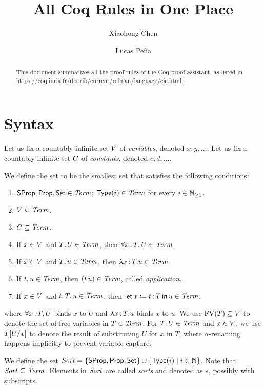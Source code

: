 \documentclass{article}
\title{All Coq Rules in One Place}
\author{Xiaohong Chen \and Lucas Pe{\~{n}}a}
\begin{document}
\maketitle

\begin{abstract}
This document summarizes all the proof rules of the Coq proof assistant,
as listed in 
\url{https://coq.inria.fr/distrib/current/refman/language/cic.html}.
\end{abstract}

\section{Syntax}

Let us fix a countably infinite set $V$ of \emph{variables}, denoted 
$x,y,\dots$. 
Let us fix a countably infinite set $C$ of \emph{constants}, denoted
$c,d,\dots$.

\begin{definition}
We define the set \CoqTerm to be the smallest set that satisfies the following 
conditions:
\begin{enumerate}
\item $\mathsf{SProp},\mathsf{Prop},\mathsf{Set} \in \textnormal{\textit{Term}}$; $\mathsf{Type}(i) \in \textnormal{\textit{Term}}$ for every $i 
\in {\mathbb{N}_{\ge 1}}$. 
\item $V \subseteq \textnormal{\textit{Term}}$.
\item $C \subseteq \textnormal{\textit{Term}}$.
\item If $x \in V$ and $T,U \in \textnormal{\textit{Term}}$, 
      then $\forall x {\,:\,} T , U \in \textnormal{\textit{Term}}$.
\item If $x \in V$ and $T,u \in \textnormal{\textit{Term}}$,
      then $\lambda x {\,:\,} T . u \in \textnormal{\textit{Term}}$.
\item If $t,u \in \textnormal{\textit{Term}}$,
      then $(t \, u) \in \textnormal{\textit{Term}}$, called \emph{application}.
\item If $x \in V$ and $t,T,u \in \textnormal{\textit{Term}}$,
      then $\textsf{let} \, x \coloneqq t {\,:\,} T \,\textsf{in}\, u \in \textnormal{\textit{Term}}$.
\end{enumerate}
where $\forall x {\,:\,} T , U$ binds $x$ to $U$
and $\lambda x {\,:\,} T . u$ binds $x$ to $u$.
We use $\mathrm{FV}(T) \subseteq V$ to denote the set of free variables in $T \in 
\textnormal{\textit{Term}}$. 
For $T,U \in \textnormal{\textit{Term}}$ and $x \in V$, 
we use $T [ U / x ]$ to denote the result of substituting $U$ for $x$ in $T$,
where $\alpha$-renaming happens implicitly to prevent variable capture.
\end{definition}

\begin{definition}
We define the set 
$\textnormal{\textit{Sort}} = \{\mathsf{SProp},\mathsf{Prop},\mathsf{Set}\} \cup \{\mathsf{Type}(i) \mid i \in \mathbb{N}\}$.
Note that $\textnormal{\textit{Sort}} \subseteq \textnormal{\textit{Term}}$. 
Elements in $\textnormal{\textit{Sort}}$ are called \emph{sorts} and denoted as $s$,
possibly with subscripts.
\end{definition}
\end{document}
